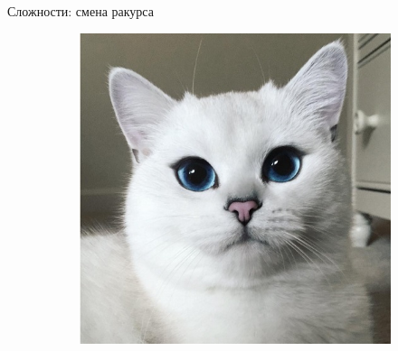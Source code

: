 \documentclass[aspectratio=169]{beamer}
\begin{document}
\begin{frame}{Сложности: смена ракурса}
\begin{figure}
\begin{subfigure}[b]{.325\linewidth}
        \end{subfigure}
        \begin{subfigure}[b]{.325\linewidth}
            \centering
            \includegraphics[width=\linewidth]{graphs/fig8_2.jpg}
        \end{subfigure}
    \end{figure}
\end{frame}
\end{document}
